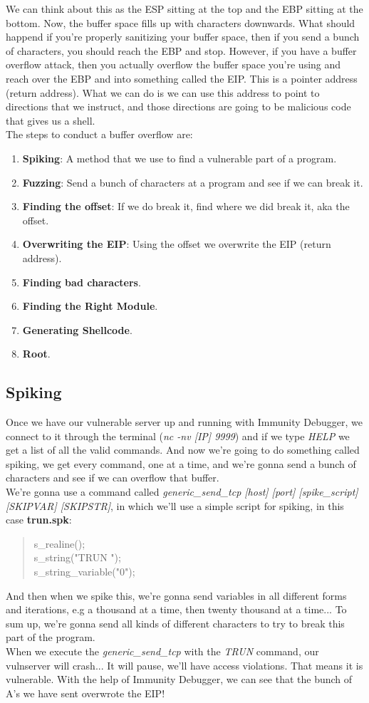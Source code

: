 \documentclass[11pt,a4paper]{article}
\begin{document}
\noindent We can think about this as the ESP sitting at the top and the EBP sitting at the bottom. Now, the buffer space fills up with characters downwards. What should happend if you're properly sanitizing your buffer space, then if you send a bunch of characters, you should reach the EBP and stop. However, if you have a buffer overflow attack, then you actually overflow the buffer space you're using and reach over the EBP and into something called the EIP. This is a pointer address (return address). What we can do is we can use this address to point to directions that we instruct, and those directions are going to be malicious code that gives us a shell.\\

The steps to conduct a buffer overflow are:
\begin{enumerate}
\item \textbf{Spiking}: A method that we use to find a vulnerable part of a program.
\item \textbf{Fuzzing}: Send a bunch of characters at a program and see if we can break it.
\item \textbf{Finding the offset}: If we do break it, find where we did break it, aka the offset.
\item \textbf{Overwriting the EIP}: Using the offset we overwrite the EIP (return address).
\item \textbf{Finding bad characters}.
\item \textbf{Finding the Right Module}.
\item \textbf{Generating Shellcode}.
\item \textbf{Root}.
\end{enumerate}

\subsection{Spiking}
Once we have our vulnerable server up and running with Immunity Debugger, we connect to it through the terminal (\textit{nc -nv [IP] 9999}) and if we type \textit{HELP} we get a list of all the valid commands. And now we're going to do something called spiking, we get every command, one at a time, and we're gonna send a bunch of characters and see if we can overflow that buffer.\\

\noindent We're gonna use a command called \textit{generic\_send\_tcp [host] [port] [spike\_script] [SKIPVAR] [SKIPSTR]}, in which we'll use a simple script for spiking, in this case \textbf{trun.spk}:
\begin{quote}
s\_realine();\\
s\_string("TRUN ");\\
s\_string\_variable("0");
\end{quote}
And then when we spike this, we're gonna send variables in all different forms and iterations, e.g a thousand at a time, then twenty thousand at a time... To sum up, we're gonna send all kinds of different characters to try to break this part of the program.\\

\noindent When we execute the \textit{generic\_send\_tcp} with the \textit{TRUN} command, our vulnserver will crash... It will pause, we'll have access violations. That means it is vulnerable. With the help of Immunity Debugger, we can see that the bunch of A's we have sent overwrote the EIP!
\end{document}
